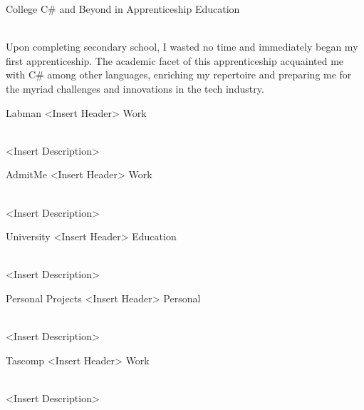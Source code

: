 \documentclass[9pt]{developercv} %
\begin{document}
\begin{entrylist}
{			\vspace{0.5cm}


			  
		}
	\entry
		{College}
		{C\# and Beyond in Apprenticeship}
		{Education}
		{\\
			Upon completing secondary school, I wasted no time and immediately began my first apprenticeship. The academic facet of this apprenticeship acquainted me with C\# among other languages, enriching my repertoire and preparing me for the myriad challenges and innovations in the tech industry.

			\vspace{0.5cm}
			    
		}
	\entry
		{Labman}
		{<Insert Header>}
		{Work}
		{\\
			<Insert Description>

			\vspace{0.5cm}
			 
		}
	\entry
		{AdmitMe}
		{<Insert Header>}
		{Work}
		{\\
			<Insert Description>

			\vspace{0.5cm}
			  
		}
	\entry
		{University}
		{<Insert Header>}
		{Education}
		{\\
			<Insert Description>

			\vspace{0.5cm}
			   
		}
	\entry
		{Personal Projects}
		{<Insert Header>}
		{Personal}
		{\\
			<Insert Description>

			\vspace{0.5cm}
			         
		}
	\entry
		{Tascomp}
		{<Insert Header>}
		{Work}
		{\\
			<Insert Description>

			\vspace{0.5cm}
			       
		}
\end{entrylist}

\vspace{1cm}	
\end{document}

